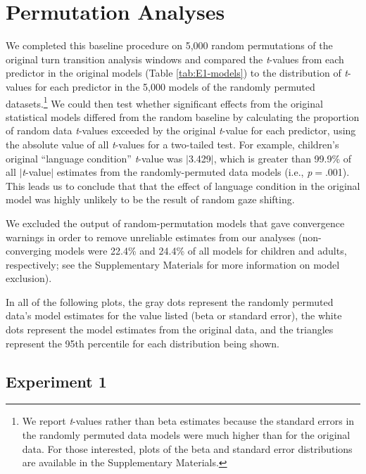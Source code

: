 \documentclass[authoryear, 12pt]{elsarticle}
\begin{document}



\appendix

\section{Permutation Analyses}
\setcounter{figure}{0}  

We completed this baseline procedure on 5,000 random permutations of the original turn transition analysis windows and compared the \textit{t}-values from each predictor in the original models (Table \ref{tab:E1-models}) to the distribution of \textit{t}-values for each predictor in the 5,000 models of the randomly permuted datasets.\footnote{We report \textit{t}-values rather than beta estimates because the standard errors in the randomly permuted data models were much higher than for the original data. For those interested, plots of the beta and standard error distributions are available in the Supplementary Materials.} We could then test whether significant effects from the original statistical models differed from the random baseline by calculating the proportion of random data \textit{t}-values exceeded by the original \textit{t}-value for each predictor, using the absolute value of all \textit{t}-values for a two-tailed test. For example, children's original ``language condition'' \textit{t}-value was $|$3.429$|$, which is greater than 99.9\% of all $|$\textit{t}-value$|$ estimates from the randomly-permuted data models (i.e., \textit{p}$=$.001). This leads us to conclude that that the effect of language condition in the original model was highly unlikely to be the result of random gaze shifting. 

We excluded the output of random-permutation models that gave convergence warnings in order to remove unreliable estimates from our analyses (non-converging models were 22.4\% and 24.4\% of all models for children and adults, respectively; see the Supplementary Materials for more information on model exclusion).

In all of the following plots, the gray dots represent the randomly permuted data's model estimates for the value listed (beta or standard error), the white dots represent the model estimates from the original data, and the triangles represent the 95th percentile for each distribution being shown.

\subsection{Experiment 1}
\end{document}
